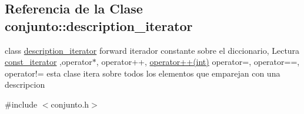 \hypertarget{classconjunto_1_1description__iterator}{\subsection{Referencia de la Clase conjunto\-:\-:description\-\_\-iterator}
\label{classconjunto_1_1description__iterator}
}


class \hyperlink{classconjunto_1_1description__iterator}{description\-\_\-iterator} forward iterador constante sobre el diccionario, Lectura \hyperlink{classconjunto_1_1const__iterator}{const\-\_\-iterator} ,operator$\ast$, operator++, \hyperlink{classconjunto_1_1description__iterator_a64fc4430bdd907e7ee03992c77f419af}{operator++(int)} operator=, operator==, operator!= esta clase itera sobre todos los elementos que emparejan con una descripcion  




{\ttfamily \#include $<$conjunto.\-h$>$}

